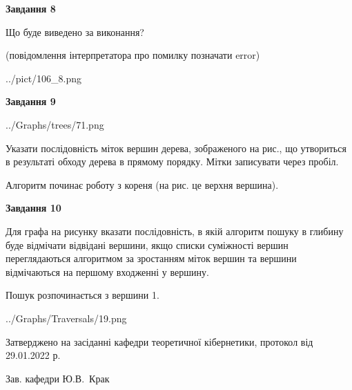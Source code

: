 \documentclass[12pt, ukrainian]{article}
\begin{document}
{\begin {large}
{\begin {center}\textbf{Завдання 8}\end {center}}\par
Що буде виведено за виконання?\par
 (повідомлення інтерпретатора про помилку позначати error)\par
\begin{center}
	{../pict/106_8.png}
\end{center}
\newpage

{\begin {center}\textbf{Завдання 9}\end {center}}\par

\begin{center}
	{../Graphs/trees/71.png}
\end{center}
Указати послідовність міток вершин дерева, зображеного на рис., що утвориться в результаті обходу дерева в прямому порядку. Мітки записувати через пробіл.\par Алгоритм починає роботу з кореня (на рис. це верхня вершина).\par
\newpage

{\begin {center}\textbf{Завдання 10}\end {center}}\par
Для графа на рисунку вказати послідовність, в якій алгоритм пошуку в глибину буде відмічати відвідані вершини, якщо списки суміжності вершин переглядаються алгоритмом за зростанням міток вершин та вершини відмічаються на першому вход\-женні у вершину.\par
Пошук розпочинається з вершини 1.\par

\begin{center}
	{../Graphs/Traversals/19.png}
\end{center}\par
\newpage


\end {large}
}
{\smallskip \begin {small} Затверджено на засіданні кафедри теоретичної кібернетики, протокол  від   29.01.2022 р.\par\smallskip\smallskip
{\parbox {6.5 cm}{Зав. кафедри \dotfill Ю.В.~Крак}} \end{small}}
\end{document}
